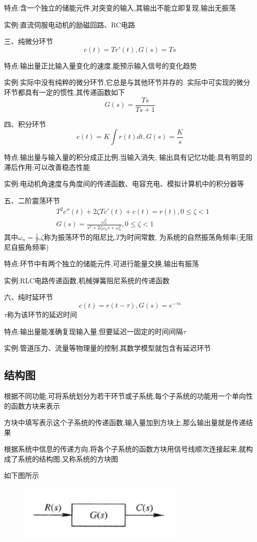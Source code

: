 \documentclass[12pt,a4paper,oneside]{ctexart}
\begin{document}
特点:含一个独立的储能元件,对突变的输入,其输出不能立即复现,输出无振荡

实例:直流伺服电动机的励磁回路、RC电路

三、纯微分环节
\[
    c(t)=Tr'(t),G(s)=Ts
\]

特点:输出量正比输入量变化的速度,能预示输入信号的变化趋势

实例:实际中没有纯粹的微分环节,它总是与其他环节并存的.
实际中可实现的微分环节都具有一定的惯性,其传递函数如下
\[
    G(s) = \frac{Ts}{Ts+1}
\]

四、积分环节
\[
    c(t)=K\int r(t)dt,G(s)=\frac{K}{s}
\]

特点:输出量与输入量的积分成正比例,当输入消失,
输出具有记忆功能;具有明显的滞后作用;可以改善稳态性能

实例:电动机角速度与角度间的传递函数、电容充电、模拟计算机中的积分器等

五、二阶震荡环节
\begin{align*}
    &T^2c''(t)+2\zeta Tc'(t)+c(t) = r(t),0\le \zeta <1\\
    &G(s) = \frac{\omega_n^2}{s^2+2\zeta \omega_ns+\omega_n^2},0\le \zeta <1
\end{align*}
其中$\omega_n=\frac{1}{T}$,$\zeta$称为振荡环节的阻尼比,$T$为时间常数,
为系统的自然振荡角频率(无阻尼自振角频率)

特点:环节中有两个独立的储能元件,可进行能量交换,输出有振荡

实例:RLC电路传递函数,机械弹簧阻尼系统的传递函数

六、纯时延环节
\[
    c(t)=r(t-\tau),G(s)=e^{-\tau s}
\]
$\tau$称为该环节的延迟时间

特点:输出量能准确复现输入量,但要延迟一固定的时间间隔$\tau$

实例:管道压力、流量等物理量的控制,其数学模型就包含有延迟环节

\subsection{结构图}
根据不同功能,可将系统划分为若干环节或子系统,每个子系统的功能用一个单向性的函数方块来表示

方块中填写表示这个子系统的传递函数,输入量加到方块上,那么输出量就是传递结果

根据系统中信息的传递方向,将各个子系统的函数方块用信号线顺次连接起来,就构成了系统的结构图,又称系统的方块图

如下图所示
\begin{figure}[H]
    \centering
    \includegraphics[width=8cm]{photos/结构图原件.png}
\end{figure}
\end{document}
